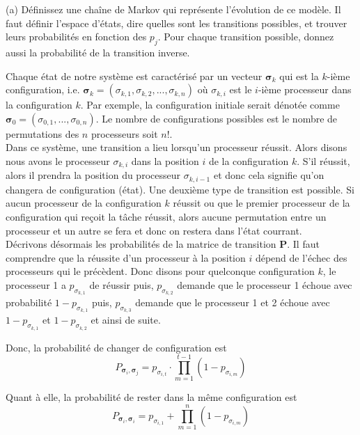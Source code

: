 \documentclass{article}
\begin{document}
\noindent (a) Définissez une chaîne de Markov qui représente l'évolution 
de ce modèle. Il faut définir l'espace d'états, dire quelles sont les 
transitions possibles, et trouver leurs probabilités en fonction des 
$p_j$. Pour chaque transition possible, donnez aussi la probabilité de 
la transition inverse.

\vspace{.5cm}
Chaque état de notre système est caractérisé par un vecteur $\boldsymbol{\sigma}_k$ qui est la $k$-ième configuration, i.e. 
$\boldsymbol{\sigma}_k=(\sigma_{k,1},\sigma_{k,2},...,\sigma_{k,n})$ où $\sigma_{k,i}$ est le $i$-ième processeur dans la 
configuration $k$. Par exemple, la configuration initiale serait dénotée comme $\boldsymbol{\sigma}_0=(\sigma_{0,1},...,\sigma_{0,n})$.
Le nombre de configurations possibles est le nombre de permutations des $n$ processeurs soit $n!$. \\

\noindent Dans ce système, une transition a lieu lorsqu'un processeur réussit. Alors disons nous avons le processeur $\sigma_{k,i}$
dans la position $i$ de la configuration $k$. S'il réussit, alors il prendra la position du processeur $\sigma_{k,i-1}$ et donc
cela signifie qu'on changera de configuration (état). Une deuxième type de transition est possible. Si aucun processeur de la
configuration $k$ réussit ou que le premier processeur de la configuration qui reçoit la tâche réussit, alors aucune permutation
entre un processeur et un autre se fera et donc on restera dans l'état courrant. \\

\noindent Décrivons désormais les probabilités de la matrice de transition $\boldsymbol{P}$. Il faut comprendre que la réussite
d'un processeur à la position $i$ dépend de l'échec des processeurs qui le précèdent. Donc disons pour quelconque configuration
$k$, le processeur 1 a $p_{\sigma_{k,1}}$ de réussir puis, $p_{\sigma_{k,2}}$ demande que le processeur 1 échoue avec probabilité
$1-p_{\sigma_{k,1}}$ puis, $p_{\sigma_{k,3}}$ demande que le processeur 1 et 2 échoue avec $1-p_{\sigma_{k,1}}$ et $1-p_{\sigma_{k,2}}$
et ainsi de suite.

\vspace{.3cm}
Donc, la probabilité de changer de configuration est
\[
    P_{\boldsymbol{\sigma}_i,\boldsymbol{\sigma}_j}=p_{\sigma_{i,t}}\cdot\prod_{m=1}^{t-1}\left(1-p_{\sigma_{i,m}}\right)
\]

\vspace{.2cm}
Quant à elle, la probabilité de rester dans la même configuration est
\[
    P_{\boldsymbol{\sigma}_i,\boldsymbol{\sigma}_i}=p_{\sigma_{i,1}}+\prod_{m=1}^{n}\left(1-p_{\sigma_{i,m}}\right)
\]
\end{document}
